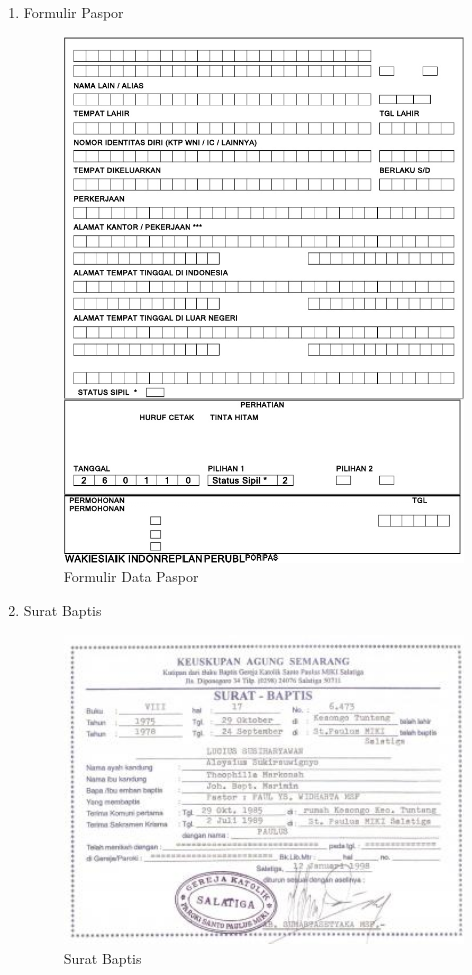 \begin{enumerate}
	\item Formulir Paspor
	\begin{figure}[H]
		\centering
		\includegraphics[width=12cm]{figures/formulirpaspor.jpg}
		\caption{Formulir Data Paspor}	
	\end{figure}

	\item Surat Baptis
	\begin{figure}[H]
		\centering
		\includegraphics[width=12cm]{figures/suratbaptis.jpg}
		\caption{Surat Baptis}	
	\end{figure}


\end{enumerate}
